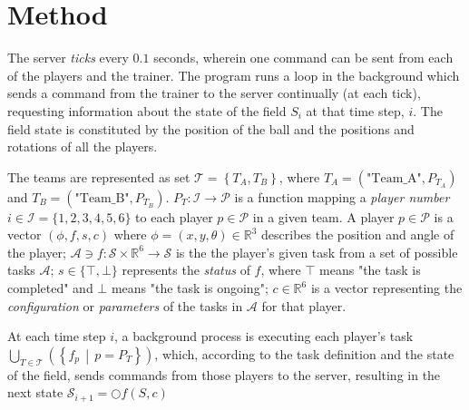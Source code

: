 \documentclass[10pt,a4paper]{article}
\begin{document}
\section{Method}

The server \textit{ticks} every \(0.1\) seconds, wherein one command can be sent from each of the players and the trainer. The program runs a loop in the background which sends a command from the trainer to the server continually (at each tick), requesting information about the state of the field \(S_i\) at that time step, \(i\). The field state is constituted by the position of the ball and the positions and rotations of all the players.

The teams are represented as set \(\mathcal{T} = \left\{ T_A, T_B \right\}\), where \(T_A = (\text{"Team\_A"}, P_{T_A})\) and \(T_B = (\text{"Team\_B"}, P_{T_B})\). \(P_T : \mathcal{I} \to \mathcal{P} \) is a function mapping a \textit{player number} \(i\in \mathcal{I} = \{1,2,3,4,5, 6\}\) to each player \(p \in \mathcal{P}\) in a given team. A player \(p\in \mathcal{P}\) is a vector \((\phi, f, s, c)\) where \(\phi = (x, y, \theta) \in \mathbb{R}^3\) describes the position and angle of the player; \(\mathcal{A} \ni f:\mathcal{S} \times \mathbb{R}^6 \to \mathcal{S}\) is the the player's given task from a set of possible tasks \(\mathcal{A}\); \(s \in \{\top,\bot\}\) represents the \textit{status} of \(f\), where \(\top\) means "the task is completed" and \(\bot\) means "the task is ongoing"; \(c \in \mathbb{R}^6\) is a vector representing the \textit{configuration} or \textit{parameters} of the tasks in \(\mathcal{A}\) for that player.

At each time step \(i\), a background process is executing each player's task \(\bigcup_{T\in\mathcal{T}}\left( \left\{ f_p \,\middle|\, p = P_T \right\} \right)\), which, according to the task definition and the state of the field, sends commands from those players to the server, resulting in the next state \(\mathcal{S}_{i+1} = \bigcirc f(S, c)\)
\end{document}
